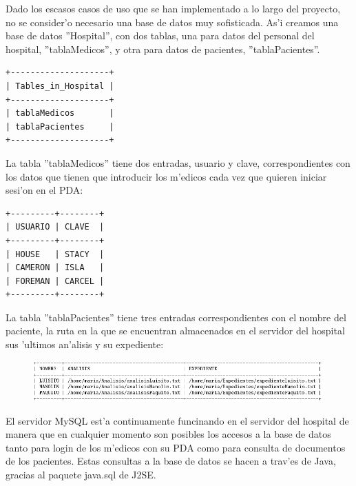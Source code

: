 Dado los escasos casos de uso que se han implementado a lo largo del proyecto, no se consider'o necesario una base de datos muy sofisticada. As'i creamos una base de datos ''Hospital'', con dos tablas, una para datos del personal del hospital, ''tablaMedicos'', y otra para datos de pacientes, ''tablaPacientes''.

\begin{verbatim}
+--------------------+
| Tables_in_Hospital |
+--------------------+
| tablaMedicos       |
| tablaPacientes     |
+--------------------+
\end{verbatim}

La tabla ''tablaMedicos'' tiene dos entradas, usuario y clave, correspondientes con los datos que tienen que introducir los m'edicos cada vez que quieren iniciar sesi'on en el PDA:
\newpage
\begin{verbatim}
+---------+--------+
| USUARIO | CLAVE  |
+---------+--------+
| HOUSE   | STACY  |
| CAMERON | ISLA   |
| FOREMAN | CARCEL |
+---------+--------+
\end{verbatim}

La tabla ''tablaPacientes'' tiene tres entradas correspondientes con el nombre del paciente, la ruta en la que se encuentran almacenados en el servidor del hospital sus 'ultimos an'alisis y su expediente:

\begin{figure}[h]
	\begin{center}
		\includegraphics[scale=0.55]{bd.png}
     	\end{center}
\end{figure}

El servidor MySQL est'a continuamente funcinando en el servidor del hospital de manera que en cualquier momento son posibles los accesos a la base de datos tanto para login de los m'edicos con su PDA como para consulta de documentos de los pacientes. Estas consultas a la base de datos se hacen a trav'es de Java, gracias al paquete java.sql de J2SE.